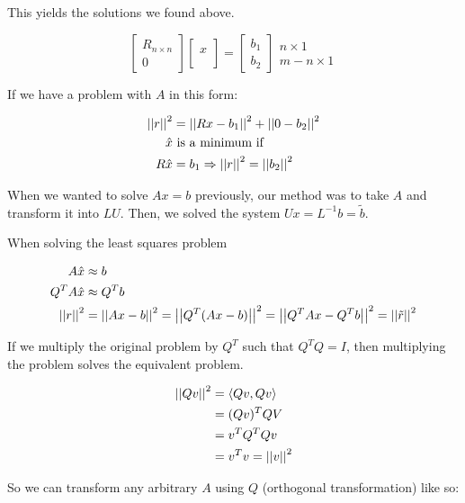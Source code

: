 This yields the solutions we found above.

\[
  \begin{bmatrix}
    R_{n \times n} \\ 0
  \end{bmatrix}
  \begin{bmatrix}
    \\ x \\ \\
  \end{bmatrix}
  =
  \begin{bmatrix}
    {b_1} \\ {b_2}
  \end{bmatrix}
  \begin{matrix}
     n \times 1 \\ m- n \times 1
  \end{matrix}
\]

If we have a problem with $A$ in this form:

\begin{align*}  
  \left|\left|r\right|\right|^2 &= \left|\left|Rx - b_1\right|\right|^2 + \left|\left|0 - b_2\right|\right|^2 \\
  \hat{x} &\text{ is a minimum if }\\
  R\hat{x} &= b_1 \Rightarrow \left|\left|r\right|\right|^2 = \left|\left|b_2\right|\right|^2
\end{align*}  

When we wanted to solve $Ax=b$ previously, our method was to take $A$ and transform it into $LU$. Then, we solved the system $Ux = L^{-1}b = \tilde{b}$.

When solving the least squares problem

\begin{align*}
  A\hat{x} &\approx b \\
  Q^TA\hat{x} &\approx Q^Tb \\
  \left|\left|r\right|\right|^2 &= \left|\left|Ax - b\right|\right|^2 = \left|\left|Q^T(Ax-b)\right|\right|^2 = \left|\left|Q^TAx - Q^Tb\right|\right|^2 = \left|\left|\tilde{r}\right|\right|^2
\end{align*}

If we multiply the original problem by $Q^T$ such that $Q^TQ = I$, then multiplying the problem solves the equivalent problem.

\begin{align*}
  \left|\left|Qv\right|\right|^2 &= \langle Qv, Qv\rangle \\
  &= (Qv)^T QV \\
  &= v^TQ^TQv \\
  &= v^T v = \left|\left|v\right|\right|^2
\end{align*}

So we can transform any arbitrary $A$ using $Q$ (orthogonal transformation) like so:

